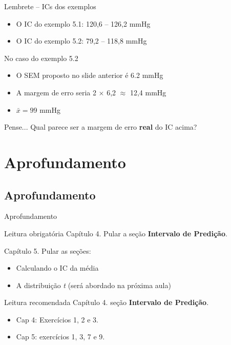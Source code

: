 \documentclass{beamer}
\begin{document}
\begin{frame}
  \begin{exampleblock}{Lembrete -- ICs dos exemplos}
    \begin{itemize}
    \item O IC do exemplo 5.1: 120,6 -- 126,2 mmHg
    \item O IC do exemplo 5.2: 79,2 -- 118,8 mmHg
    \end{itemize}
  \end{exampleblock}
  \begin{block}{No caso do exemplo 5.2}
    \begin{itemize}
    \item O SEM proposto no slide anterior é 6.2 mmHg
    \item A margem de erro seria  2 $\times $ 6,2 $\approx$ 12,4 mmHg
    \item $\bar{x} = 99$ mmHg
    \end{itemize}
  \end{block}
  \begin{block}{Pense...}
    Qual parece ser a margem de erro {\bf real} do IC acima?
  \end{block}
\end{frame}

\section{Aprofundamento}

\subsection{Aprofundamento}

\begin{frame}{Aprofundamento}
  \begin{block}{Leitura obrigatória}
    Capítulo 4. Pular a seção {\bf Intervalo de Predição}.

    Capítulo 5. Pular as seções:
    \begin{itemize}
    \item Calculando o IC da média
    \item A distribuição {\em t} (será abordado na próxima aula)
    \end{itemize}

  \end{block}
  \begin{block}{Leitura recomendada}
    Capítulo 4. seção {\bf Intervalo de Predição}.
  \end{block}
  \begin{itemize}
  \item Cap 4: Exercícios 1, 2 e 3.
  \item Cap 5: exercícios 1, 3, 7 e 9.
  \end{itemize}
\end{frame}
\end{document}
